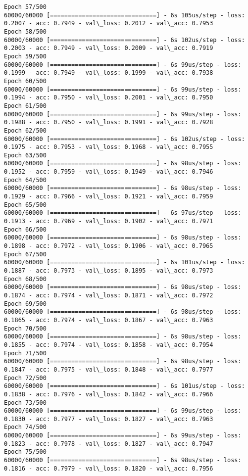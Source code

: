 \documentclass[11pt]{article}
\begin{document}
\begin{Verbatim}[commandchars=\\\{\}]
Epoch 57/500
60000/60000 [==============================] - 6s 105us/step - loss: 0.2007 - acc: 0.7949 - val\_loss: 0.2012 - val\_acc: 0.7953
Epoch 58/500
60000/60000 [==============================] - 6s 102us/step - loss: 0.2003 - acc: 0.7949 - val\_loss: 0.2009 - val\_acc: 0.7919
Epoch 59/500
60000/60000 [==============================] - 6s 99us/step - loss: 0.1999 - acc: 0.7949 - val\_loss: 0.1999 - val\_acc: 0.7938
Epoch 60/500
60000/60000 [==============================] - 6s 99us/step - loss: 0.1994 - acc: 0.7950 - val\_loss: 0.2001 - val\_acc: 0.7950
Epoch 61/500
60000/60000 [==============================] - 6s 99us/step - loss: 0.1988 - acc: 0.7950 - val\_loss: 0.1991 - val\_acc: 0.7928
Epoch 62/500
60000/60000 [==============================] - 6s 102us/step - loss: 0.1975 - acc: 0.7953 - val\_loss: 0.1968 - val\_acc: 0.7955
Epoch 63/500
60000/60000 [==============================] - 6s 98us/step - loss: 0.1952 - acc: 0.7959 - val\_loss: 0.1949 - val\_acc: 0.7946
Epoch 64/500
60000/60000 [==============================] - 6s 98us/step - loss: 0.1929 - acc: 0.7966 - val\_loss: 0.1921 - val\_acc: 0.7959
Epoch 65/500
60000/60000 [==============================] - 6s 97us/step - loss: 0.1913 - acc: 0.7969 - val\_loss: 0.1902 - val\_acc: 0.7971
Epoch 66/500
60000/60000 [==============================] - 6s 98us/step - loss: 0.1898 - acc: 0.7972 - val\_loss: 0.1906 - val\_acc: 0.7965
Epoch 67/500
60000/60000 [==============================] - 6s 101us/step - loss: 0.1887 - acc: 0.7973 - val\_loss: 0.1895 - val\_acc: 0.7973
Epoch 68/500
60000/60000 [==============================] - 6s 98us/step - loss: 0.1874 - acc: 0.7974 - val\_loss: 0.1871 - val\_acc: 0.7972
Epoch 69/500
60000/60000 [==============================] - 6s 98us/step - loss: 0.1865 - acc: 0.7974 - val\_loss: 0.1867 - val\_acc: 0.7963
Epoch 70/500
60000/60000 [==============================] - 6s 98us/step - loss: 0.1855 - acc: 0.7974 - val\_loss: 0.1858 - val\_acc: 0.7954
Epoch 71/500
60000/60000 [==============================] - 6s 98us/step - loss: 0.1847 - acc: 0.7975 - val\_loss: 0.1848 - val\_acc: 0.7977
Epoch 72/500
60000/60000 [==============================] - 6s 101us/step - loss: 0.1838 - acc: 0.7976 - val\_loss: 0.1842 - val\_acc: 0.7966
Epoch 73/500
60000/60000 [==============================] - 6s 99us/step - loss: 0.1830 - acc: 0.7977 - val\_loss: 0.1827 - val\_acc: 0.7963
Epoch 74/500
60000/60000 [==============================] - 6s 99us/step - loss: 0.1823 - acc: 0.7978 - val\_loss: 0.1827 - val\_acc: 0.7947
Epoch 75/500
60000/60000 [==============================] - 6s 98us/step - loss: 0.1816 - acc: 0.7979 - val\_loss: 0.1820 - val\_acc: 0.7956

\end{Verbatim}
\end{document}
